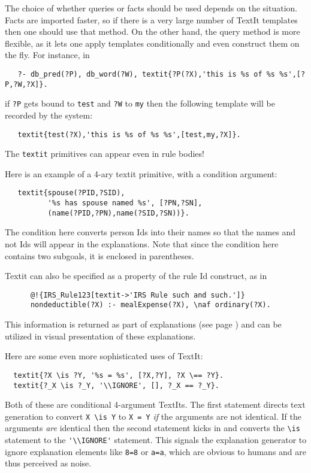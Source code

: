 The choice of whether queries or facts should be used depends on the situation.
Facts are imported faster, so if there is a very large number of TextIt
templates then one should use that method. On the other hand, the query
method is more flexible, as it lets one apply templates conditionally
and even construct them on the fly. For instance, in
\begin{verbatim}
   ?- db_pred(?P), db_word(?W), textit{?P(?X),'this is %s of %s %s',[?P,?W,?X]}.
\end{verbatim}
if \texttt{?P} gets bound to \texttt{test} and \texttt{?W} to \texttt{my}
then the following template will be recorded by the system:
\begin{verbatim}
   textit{test(?X),'this is %s of %s %s',[test,my,?X]}.
\end{verbatim}
The \texttt{textit} primitives can appear even in rule bodies! 

Here is an example of a 4-ary textit primitive, with a condition argument:
\begin{verbatim}
   textit{spouse(?PID,?SID),
          '%s has spouse named %s', [?PN,?SN],
          (name(?PID,?PN),name(?SID,?SN))}.
\end{verbatim}
The condition here converts person Ids into their names so that the names
and not Ids will appear in the explanations.
Note that since the condition here contains two subgoals,
it is enclosed in parentheses.

Textit can also be specified as a property of the rule Id construct, as in
\begin{verbatim}
      @!{IRS_Rule123[textit->'IRS Rule such and such.']}
      nondeductible(?X) :- mealExpense(?X), \naf ordinary(?X).
\end{verbatim}
This information is returned as part of explanations (see page
\pageref{page-rule-textit}) and can be
utilized in visual presentation of these explanations.

Here are some even more sophisticated uses of TextIt:
\begin{verbatim}
  textit{?X \is ?Y, '%s = %s', [?X,?Y], ?X \== ?Y}.
  textit{?_X \is ?_Y, '\\IGNORE', [], ?_X == ?_Y}.
\end{verbatim}
Both of these are conditional 4-argument TextIts. The first statement
directs text generation to convert \verb|X \is Y| to \texttt{X = Y} \emph{if} the
arguments are not identical. If the arguments \emph{are} identical then the
second statement kicks in and converts the \verb|\is|  statement to the
\verb|'\\IGNORE'| statement. This signals the explanation generator to
ignore explanation elements like \texttt{8=8} or \texttt{a=a}, which are
obvious to humans and are thus perceived as noise. 

